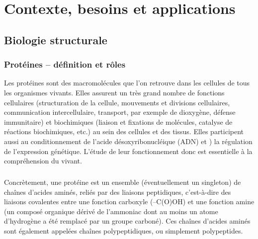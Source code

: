 
\chapter[Contexte/Besoin/Applications]{Contexte, besoins et applications}

\setcounter{minitocdepth}{4}
\minitoc
\label{chap1}
\cleardoublepage

	\section{Biologie structurale}
	\subsection{Protéines -- définition et rôles}
	Les protéines sont des macromolécules que l'on retrouve dans les cellules de tous les organismes vivants. Elles assurent un très grand nombre de fonctions cellulaires (structuration de la cellule, mouvements et divisions cellulaires, communication intercellulaire, transport, par exemple de dioxygène, défense immunitaire) et biochimiques (liaison et fixations de molécules, catalyse de réactions biochimiques, etc.) au sein des cellules et des tissus. Elles participent aussi au conditionnement de l'acide désoxyribonucléique (ADN) et ) la régulation de l'expression génétique. L'étude de leur fonctionnement donc est essentielle à la compréhension du vivant.
	
	\paragraph*{}
	Concrètement, une protéine est un ensemble (éventuellement un singleton) de chaînes d'acides aminés, reliés par des liaisons peptidiques, c'est-à-dire des liaisons covalentes entre une fonction carboxyle (–C(O)OH) et une fonction amine (un composé organique dérivé de l'ammoniac dont au moins un atome d'hydrogène a été remplacé par un groupe carboné). Ces chaînes d'acides aminés sont également appelées chaînes polypeptidiques, ou simplement polypeptides.
	
